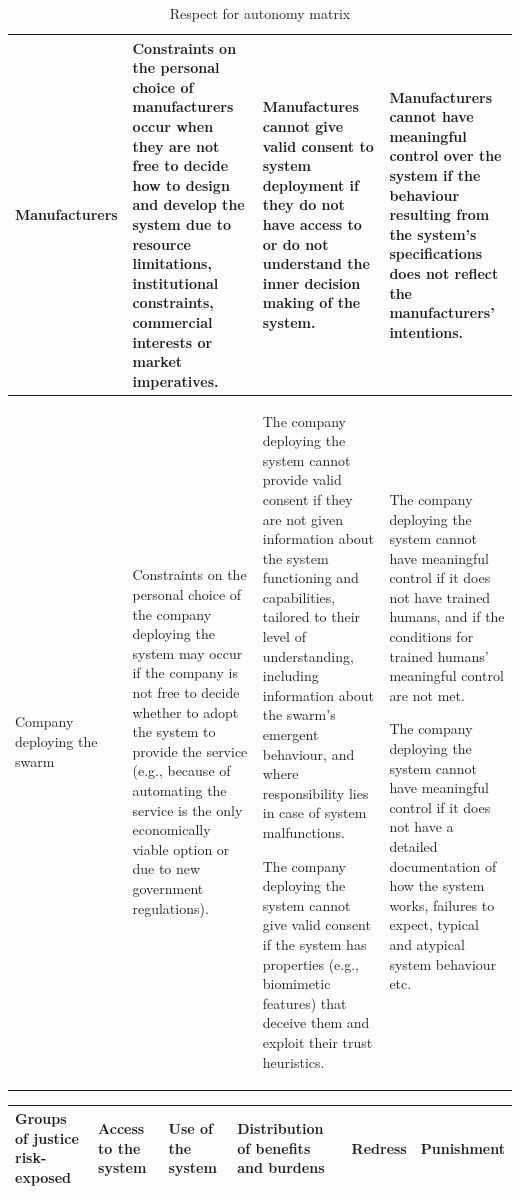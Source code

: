\documentclass[lettersize,journal]{IEEEtran}
\begin{document}
{\begin{landscape}
\begin{table}[]
\begin{tabular}{|p{0.10\textheight}|p{0.35\textheight}|p{0.35\textheight}|p{0.35\textheight}|}
Manufacturers & Constraints on the personal choice of manufacturers occur when they are not free to decide how to design and develop the system due to resource limitations, institutional constraints, commercial interests or market imperatives. & Manufactures cannot give valid consent to system deployment if they do not have access to or do not understand the inner decision making of the system. & Manufacturers cannot have meaningful control over the system if the behaviour resulting from the system’s specifications does not reflect the manufacturers’ intentions. \\ \hline

Company deploying the swarm & Constraints on the personal choice of the company deploying the system may occur if the company is not free to decide whether to adopt the system to provide the service (e.g., because of automating the service is the only economically viable option or due to new government regulations). & The company deploying the system cannot provide valid consent if they are not given information about the system functioning and capabilities, tailored to their level of understanding, including information about the swarm’s emergent behaviour, and where responsibility lies in case of system malfunctions. 

The company deploying the system cannot give valid consent if the system has properties (e.g., biomimetic features) that deceive them and exploit their trust heuristics. &  The company deploying the system cannot have meaningful control if it does not have trained humans, and if the conditions for trained humans’ meaningful control are not met.

The company deploying the system cannot have meaningful control if it does not have a detailed documentation of how the system works, failures to expect, typical and atypical system behaviour etc.\\ \hline 
\end{tabular}
\caption{\label{tab:autonomy}Respect for autonomy matrix}
\end{table}

\end{landscape}


\begin{landscape}
\begin{table}[]
\begin{tabular}{|p{0.15\textheight}|p{0.18\textheight}|p{0.18\textheight}|p{0.18\textheight}|p{0.18\textheight}|p{0.18\textheight}|}
\hline
Groups of justice risk-exposed & Access to the system & Use of the system & Distribution of benefits and burdens & Redress & Punishment \\ \hline


\end{tabular}
\end{table}
\end{landscape}}
\end{document}
